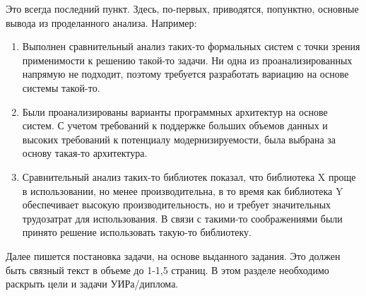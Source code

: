 Это всегда последний пункт. Здесь, по-первых, приводятся, попунктно, основные вывода из проделанного анализа. Например:

\begin{enumerate}
	\item Выполнен сравнительный анализ таких-то формальных систем с точки зрения применимости к решению такой-то задачи. Ни одна из проанализированных напрямую не подходит, поэтому требуется разработать вариацию на основе системы такой-то.
	\item Были проанализированы варианты программных архитектур на основе систем. С учетом требований к поддержке больших объемов данных и высоких требований к потенциалу модернизируемости, была выбрана за основу такая-то архитектура.
	\item Сравнительный анализ таких-то библиотек показал, что библиотека X проще в использовании, но менее производительна, в то время как библиотека Y обеспечивает высокую производительность, но и требует значительных трудозатрат для использования. В связи с такими-то соображениями были принято решение использовать такую-то библиотеку.
\end{enumerate}

Далее пишется постановка задачи, на основе выданного задания. Это должен быть связный текст в объеме до 1-1,5 страниц. В этом разделе необходимо раскрыть цели и задачи УИРа/диплома.